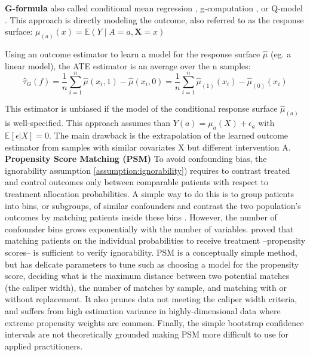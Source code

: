 \documentclass[10pt,letterpaper]{article}
\begin{document}
\textbf{G-formula} also called conditional mean regression
\cite{wendling2018comparing}, g-computation \cite{robins1986role}, or
Q-model \cite{snowden2011implementation}. This approach is directly modeling
the outcome, also referred to as the response surface: $\mu_{(a)}(x)
  =\mathbb{E}\left(Y \mid A=a, \mathbf{X}=x\right)$

Using an outcome estimator to learn a model for the response surface $\hat
  \mu$ (eg. a linear model), the ATE estimator is an average over the n samples:
\begin{equation}
  \hat{\tau}_G(f) = \frac{1}{n} \sum_{i=1}^n \hat \mu(x_i, 1) - \hat \mu(x_i, 0) = \frac{1}{n} \sum_{i=1}^n \hat \mu_{(1)}(x_i) - \hat \mu_{(0)}(x_i)
\end{equation}

This estimator is unbiased if the model of the conditional response surface
$\hat \mu_{(a)}$ is well-specified. This approach assumes than $Y(a) =
  \mu_a(X) + \epsilon_a$ with $\mathbb E[\epsilon|X] = 0$. The main drawback is
the extrapolation of the learned outcome estimator from samples with similar
covariates X but different intervention A.\\

\textbf{Propensity Score Matching (PSM)} To avoid confounding bias, the
ignorability assumption \ref{assumption:ignorability}) requires to contrast
treated and control outcomes only between comparable patients with respect to
treatment allocation probabilities. A simple way to do this is to group
patients into bins, or subgroups, of similar confounders and contrast the two
population's outcomes by matching patients inside these bins
\cite{stuart2010matching}. However, the number of confounder bins grows
exponentially with the number of variables. \cite{rosenbaum1983central} proved
that matching patients on the individual probabilities to receive treatment
--propensity scores-- is sufficient to verify ignorability. PSM is a
conceptually simple method, but has delicate parameters to tune such as
choosing a model for the propensity score, deciding what is the maximum
distance between two potential matches (the caliper width), the number of
matches by sample, and matching with or without replacement. It also prunes data
not meeting the caliper width criteria, and suffers from high estimation
variance in highly-dimensional data where extreme propensity weights are common.
Finally, the simple bootstrap confidence intervals are not theoretically
grounded \cite{abadie2008failure} making PSM more difficult
to use for applied practitioners.\\
\end{document}
